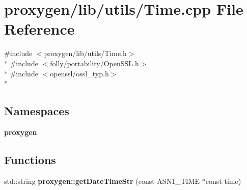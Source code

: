 \section{proxygen/lib/utils/\+Time.cpp File Reference}
\label{Time_8cpp}
{\ttfamily \#include $<$proxygen/lib/utils/\+Time.\+h$>$}\\*
{\ttfamily \#include $<$folly/portability/\+Open\+S\+S\+L.\+h$>$}\\*
{\ttfamily \#include $<$openssl/ossl\+\_\+typ.\+h$>$}\\*
\subsection*{Namespaces}
\begin{DoxyCompactItemize}
\item 
 {\bf proxygen}
\end{DoxyCompactItemize}
\subsection*{Functions}
\begin{DoxyCompactItemize}
\item 
std\+::string {\bf proxygen\+::get\+Date\+Time\+Str} (const A\+S\+N1\+\_\+\+T\+I\+ME $\ast$const time)
\end{DoxyCompactItemize}

